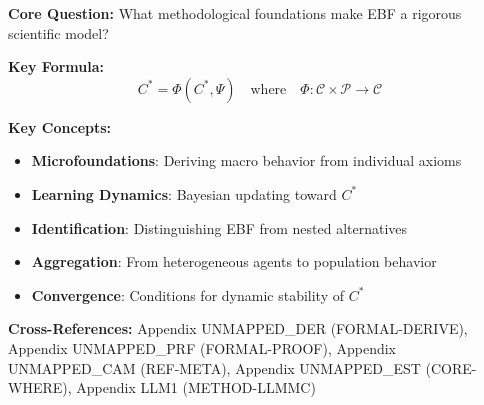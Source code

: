 \begin{abstract}
This appendix addresses five fundamental methodological challenges in constructing
EBF: (1) Microfoundations---how axioms derive from primitive assumptions;
(2) Learning Theory---how agents form and update expectations;
(3) Dynamic Adjustment---how systems converge to reference structure $C^*$;
(4) Heterogeneity and Aggregation---how individual differences scale;
(5) Identification and Model Comparison---how to distinguish EBF from alternatives.
These foundations ensure EBF meets rigorous standards of economic methodology.
\end{abstract}

\begin{tcolorbox}[colback=blue!5!white, colframe=blue!75!black,
    title=Quick Reference: METHOD-CONSTRUCT]

\textbf{Core Question:} What methodological foundations make EBF a rigorous scientific model?

\textbf{Key Formula:}
\begin{equation}
C^* = \Phi(C^*, \Psi) \quad \text{where} \quad \Phi: \mathcal{C} \times \mathcal{P} \to \mathcal{C}
\end{equation}

\textbf{Key Concepts:}
\begin{itemize}[nosep]
\item \textbf{Microfoundations}: Deriving macro behavior from individual axioms
\item \textbf{Learning Dynamics}: Bayesian updating toward $C^*$
\item \textbf{Identification}: Distinguishing EBF from nested alternatives
\item \textbf{Aggregation}: From heterogeneous agents to population behavior
\item \textbf{Convergence}: Conditions for dynamic stability of $C^*$
\end{itemize}

\textbf{Cross-References:} Appendix UNMAPPED_DER (FORMAL-DERIVE), Appendix UNMAPPED_PRF (FORMAL-PROOF),
Appendix UNMAPPED_CAM (REF-META), Appendix UNMAPPED_EST (CORE-WHERE), Appendix LLM1 (METHOD-LLMMC)
\end{tcolorbox}



